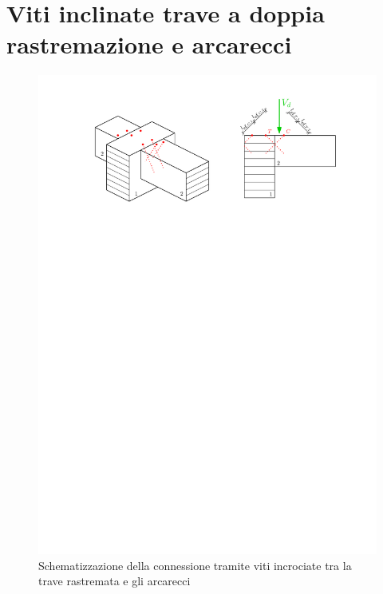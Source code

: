 \section{Viti inclinate trave a doppia rastremazione e arcarecci}
\begin{figure}[H]
    \centering
    \includegraphics[]{IMG/VitiIncrociate_doppie.pdf}
    \caption{Schematizzazione della connessione tramite viti incrociate tra la trave rastremata e gli arcarecci}
    \label{fig:VitiIncrociate}
\end{figure}
